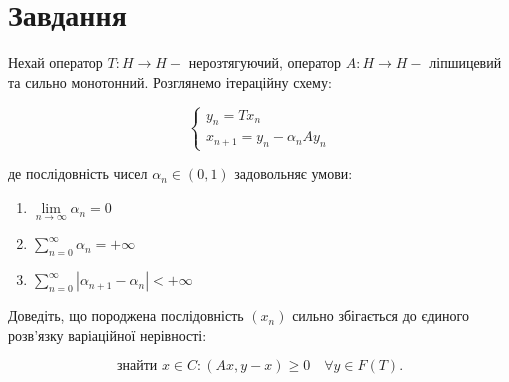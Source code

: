 
\chapter{Завдання \theHchapter}

\begin{tcolorbox}[title=Завдання]
    Нехай оператор $T: H \rightarrow H-$ нерозтягуючий, оператор $A: H \rightarrow H-$ ліпшицевий та сильно монотонний. Розглянемо ітераційну схему:

    $$
    \left\{\begin{array}{l}
    y_{n}=T x_{n} \\
    x_{n+1}=y_{n}-\alpha_{n} A y_{n}
    \end{array}\right.
    $$

    де послідовність чисел $\alpha_{n} \in(0,1)$ задовольняє умови:

    \begin{enumerate}
        \item $\lim\limits_{n \rightarrow \infty} \alpha_{n}=0$

        \item $\sum\limits_{n=0}^{\infty} \alpha_{n}=+\infty$

        \item $\sum\limits_{n=0}^{\infty}\left|\alpha_{n+1}-\alpha_{n}\right|<+\infty$

    \end{enumerate}

    Доведіть, що породжена послідовність $\left(x_{n}\right)$ сильно збігається до єдиного розв'язку варіаційної нерівності:

    $$
    \text { знайти } x \in C:(A x, y-x) \geq 0 \quad \forall y \in F(T) \text {. }
    $$


\end{tcolorbox}


